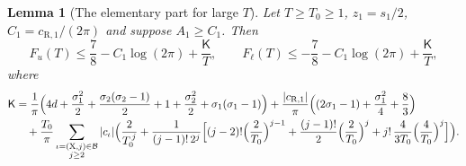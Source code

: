 \documentclass[11pt,reqno]{amsart}
\numberwithin{equation}{section}
\newtheorem{lemma}[theorem]{Lemma}
\theoremstyle{definition}
\theoremstyle{remark}
\begin{document}
\begin{lemma}[The elementary part for large $T$]\label{lem:elem_large}
Let $T\ge T_0\ge1$, $z_1=s_1/2$, $C_1=c_{\mathrm R,1}/(2\pi)$ and suppose $A_1\ge C_1$. Then
\begin{equation}
F_u(T)\le\frac78-C_1\log(2\pi)+\frac{\mathsf K}T,\qquad F_\ell(T)\le-\frac78-C_1\log(2\pi)+\frac{\mathsf K}T,
\label{eq:F_large}
\end{equation}
where
\begin{equation}
\begin{aligned}
\mathsf K&=\frac1\pi\Bigl(4d+\frac{\sigma_1^2}2+\frac{\sigma_2(\sigma_2-1)}2+1+\frac{\sigma_2^2}2+\sigma_1(\sigma_1-1)\Bigr)+\frac{|c_{\mathrm R,1}|}\pi\Bigl((2\sigma_1-1)+\frac{\sigma_1^2}4+\frac83\Bigr)\\
&\quad+\frac{T_0}\pi\sum_{\substack{\iota=(\mathrm X,j)\in\mathcal B\\ j\ge2}}|c_\iota|\Bigl(\frac2{T_0^{\,j}}+\frac1{(j-1)!\,2^j}\Bigl[(j-2)!\Bigl(\frac2{T_0}\Bigr)^{j-1}+\frac{(j-1)!}2\Bigl(\frac2{T_0}\Bigr)^{j}+j!\,\frac4{3T_0}\Bigl(\frac4{T_0}\Bigr)^{j}\Bigr]\Bigr).
\end{aligned}
\label{eq:K_def}
\end{equation}
\end{lemma}
\end{document}
